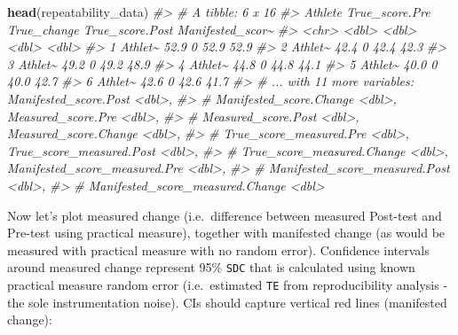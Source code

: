 \documentclass[
]{book}
\newenvironment{Shaded}{\begin{snugshade}}{\end{snugshade}}
\newcommand{\CommentTok}[1]{\textcolor[rgb]{0.56,0.35,0.01}{\textit{#1}}}
\newcommand{\KeywordTok}[1]{\textcolor[rgb]{0.13,0.29,0.53}{\textbf{#1}}}
\newcommand{\NormalTok}[1]{#1}
\begin{document}
\begin{Shaded}
\begin{Highlighting}[]
\KeywordTok{head}\NormalTok{(repeatability\_data)}
\CommentTok{\#> \# A tibble: 6 x 16}
\CommentTok{\#>   Athlete True\_score.Pre True\_change True\_score.Post Manifested\_scor\textasciitilde{}}
\CommentTok{\#>   <chr>            <dbl>       <dbl>           <dbl>            <dbl>}
\CommentTok{\#> 1 Athlet\textasciitilde{}           52.9           0            52.9             52.9}
\CommentTok{\#> 2 Athlet\textasciitilde{}           42.4           0            42.4             42.3}
\CommentTok{\#> 3 Athlet\textasciitilde{}           49.2           0            49.2             48.9}
\CommentTok{\#> 4 Athlet\textasciitilde{}           44.8           0            44.8             44.1}
\CommentTok{\#> 5 Athlet\textasciitilde{}           40.0           0            40.0             42.7}
\CommentTok{\#> 6 Athlet\textasciitilde{}           42.6           0            42.6             41.7}
\CommentTok{\#> \# ... with 11 more variables: Manifested\_score.Post <dbl>,}
\CommentTok{\#> \#   Manifested\_score.Change <dbl>, Measured\_score.Pre <dbl>,}
\CommentTok{\#> \#   Measured\_score.Post <dbl>, Measured\_score.Change <dbl>,}
\CommentTok{\#> \#   True\_score\_measured.Pre <dbl>, True\_score\_measured.Post <dbl>,}
\CommentTok{\#> \#   True\_score\_measured.Change <dbl>, Manifested\_score\_measured.Pre <dbl>,}
\CommentTok{\#> \#   Manifested\_score\_measured.Post <dbl>,}
\CommentTok{\#> \#   Manifested\_score\_measured.Change <dbl>}
\end{Highlighting}
\end{Shaded}

Now let's plot measured change (i.e.~difference between measured Post-test and Pre-test using practical measure), together with manifested change (as would be measured with practical measure with no random error). Confidence intervals around measured change represent 95\% \texttt{SDC} that is calculated using known practical measure random error (i.e.~estimated \texttt{TE} from reproducibility analysis - the sole instrumentation noise). CIs should capture vertical red lines (manifested change):
\end{document}
